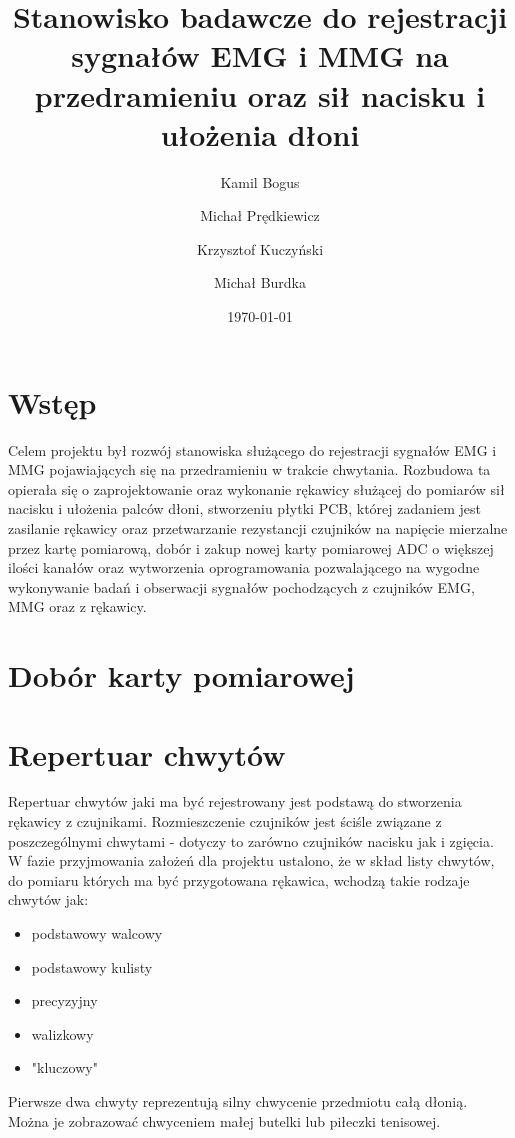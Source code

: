 \documentclass[10pt, a4paper]{article}
\author{Kamil Bogus
\and 
Michał Prędkiewicz
\and
Krzysztof Kuczyński
\and
Michał Burdka
}
\title{Stanowisko badawcze do rejestracji sygnałów EMG i MMG na przedramieniu oraz sił nacisku i ułożenia dłoni}
\date{\today}
\begin{document}
\maketitle %
%
\def\tablename{Tabela}
%

\section{Wstęp}
\label{sec:wstep} %
%
Celem projektu był rozwój stanowiska służącego do rejestracji sygnałów EMG i MMG pojawiających się na przedramieniu w trakcie chwytania. Rozbudowa ta opierała się o zaprojektowanie oraz wykonanie rękawicy służącej do pomiarów sił nacisku i ułożenia palców dłoni, stworzeniu płytki PCB, której zadaniem jest zasilanie rękawicy oraz przetwarzanie rezystancji czujników na napięcie mierzalne przez kartę pomiarową, dobór i zakup nowej karty pomiarowej ADC o większej ilości kanałów oraz wytworzenia oprogramowania pozwalającego na wygodne wykonywanie badań i obserwacji sygnałów pochodzących z czujników EMG, MMG oraz z rękawicy.

\section{Dobór karty pomiarowej}
\label{sec:karta}



\section{Repertuar chwytów}
\label{sec:chwyty}

Repertuar chwytów jaki ma być rejestrowany jest podstawą do stworzenia rękawicy z czujnikami. Rozmieszczenie czujników jest ściśle związane z poszczególnymi chwytami - dotyczy to zarówno czujników nacisku jak i zgięcia. W fazie przyjmowania założeń dla projektu ustalono, że w skład listy chwytów, do pomiaru których ma być przygotowana rękawica, wchodzą takie rodzaje chwytów jak:
\begin{itemize}
\item podstawowy walcowy
\item podstawowy kulisty
\item precyzyjny
\item walizkowy
\item "kluczowy"
\end{itemize}

Pierwsze dwa chwyty reprezentują silny chwycenie przedmiotu całą dłonią. Można je zobrazować chwyceniem małej butelki lub piłeczki tenisowej.
\end{document}
